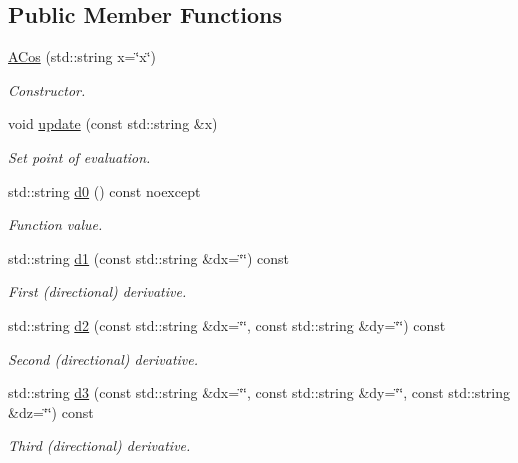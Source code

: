 \subsection*{Public Member Functions}
\begin{DoxyCompactItemize}
\item 
\hyperlink{structFunG_1_1texify_1_1ACos_a116d9f1d75b1c749d0d0daa69aad3c18}{A\-Cos} (std\-::string x=\char`\"{}x\char`\"{})
\begin{DoxyCompactList}\small\item\em Constructor. \end{DoxyCompactList}\item 
void \hyperlink{structFunG_1_1texify_1_1ACos_ae45f8aa8d0fd6a839089496225e776a9}{update} (const std\-::string \&x)
\begin{DoxyCompactList}\small\item\em Set point of evaluation. \end{DoxyCompactList}\item 
std\-::string \hyperlink{structFunG_1_1texify_1_1ACos_a3dbf7dbdb9c5a12cc603871d6b493881}{d0} () const noexcept
\begin{DoxyCompactList}\small\item\em Function value. \end{DoxyCompactList}\item 
std\-::string \hyperlink{structFunG_1_1texify_1_1ACos_ad4acc1259283ccd10dc72f5e8613667c}{d1} (const std\-::string \&dx=\char`\"{}\char`\"{}) const 
\begin{DoxyCompactList}\small\item\em First (directional) derivative. \end{DoxyCompactList}\item 
std\-::string \hyperlink{structFunG_1_1texify_1_1ACos_aed13b4dd95cf6f3eb75a1c3783412e22}{d2} (const std\-::string \&dx=\char`\"{}\char`\"{}, const std\-::string \&dy=\char`\"{}\char`\"{}) const 
\begin{DoxyCompactList}\small\item\em Second (directional) derivative. \end{DoxyCompactList}\item 
std\-::string \hyperlink{structFunG_1_1texify_1_1ACos_a8ba7333cf484c97d4160451a4ad88322}{d3} (const std\-::string \&dx=\char`\"{}\char`\"{}, const std\-::string \&dy=\char`\"{}\char`\"{}, const std\-::string \&dz=\char`\"{}\char`\"{}) const 
\begin{DoxyCompactList}\small\item\em Third (directional) derivative. \end{DoxyCompactList}\end{DoxyCompactItemize}



